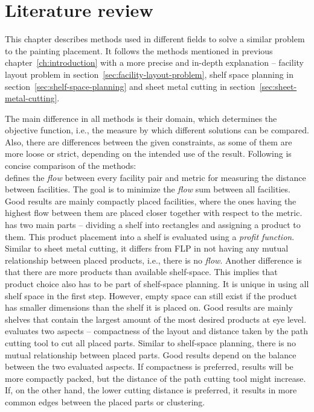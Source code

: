 \chapter{Literature review}\label{ch:literature-review}

This chapter describes methods used in different fields to solve a similar problem to the
painting placement. It follows the methods mentioned in previous chapter~\ref{ch:introduction} with
a more precise and in-depth explanation – facility layout problem in section~\ref{sec:facility-layout-problem},
shelf space planning in section~\ref{sec:shelf-space-planning} and sheet metal cutting in section~\ref{sec:sheet-metal-cutting}.

The main difference in all methods is their domain, which determines the objective function, i.e.,
the measure by which different solutions can be compared.
Also, there are differences between the given constraints, as some of them are more loose or strict,
depending on the intended use of the result. Following is concise comparison of the methods:\\

 defines the \textit{flow} between every facility pair and metric for measuring the distance between facilities.
The goal is to minimize the \textit{flow} sum between all facilities. Good results are mainly compactly placed facilities, where the ones having the
highest flow between them are placed closer together with respect to the metric.\\

 has two main parts – dividing a shelf into rectangles and assigning a product to them.
This product placement into a shelf is evaluated using a \textit{profit function}. Similar to sheet metal cutting, it differs from FLP
in not having any mutual relationship between placed products, i.e., there is no \textit{flow}.
Another difference is that there are more products than available shelf-space.
This implies that product choice also has to be part of shelf-space planning.
It is unique in using all shelf space in the first step.
However, empty space can still exist if the product has smaller dimensions than the shelf it is placed on.
Good results are mainly shelves that contain the largest amount of the most desired products at eye level.\\

 evaluates two aspects – compactness of the layout and distance taken by the path cutting tool to cut all placed parts.
Similar to shelf-space planning, there is no mutual relationship between placed parts.
Good results depend on the balance between the two evaluated aspects. If compactness is
preferred, results will be more compactly packed, but the distance of the path cutting tool might increase.
If, on the other hand, the lower cutting distance is preferred, it results in more common edges between the placed parts or clustering.\\







